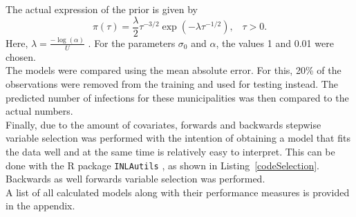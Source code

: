 The actual expression of the prior is given by
\begin{equation}
    \pi\left(\tau\right)=\frac{\lambda}{2}\tau^{-3/2}\exp\left(-\lambda\tau^{-1/2}\right),\hspace{10pt}\tau>0.
\end{equation}
Here, $\lambda=\frac{-\log\left(\alpha\right)}{U}$ \cite{martins2014penalising}.
For the parameters $\sigma_0$ and $\alpha$, the values 1 and 0.01 were chosen. \\
The models were compared using the mean absolute error. For this, 20\% of the observations were removed from the training and used for testing instead. The predicted number of infections for these municipalities was then compared to the actual numbers.
\\
Finally, due to the amount of covariates, forwards and backwards stepwise variable selection was performed with the intention of obtaining a model that fits the data well and at the same time is relatively easy to interpret. This can be done with the R package \texttt{INLAutils} \cite{inlautils}, as shown in Listing~\ref{codeSelection}. Backwards as well forwards variable selection was performed.\\
A list of all calculated models along with their performance measures is provided in the appendix.
